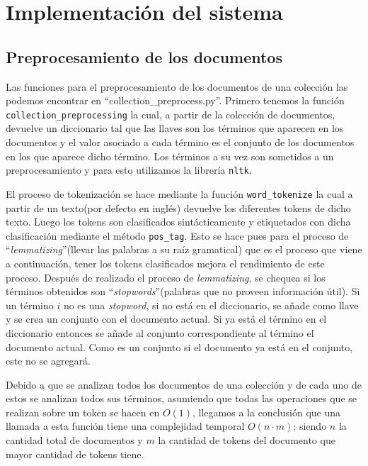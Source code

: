 \documentclass[runningheads]{llncs}
\begin{document}
	\section{Implementaci\'on del sistema}
	
	\subsection{Preprocesamiento de los documentos}
	
	Las funciones para el preprocesamiento de los documentos de una colecci\'on las podemos encontrar en ``collection\_preprocess.py''. Primero tenemos la funci\'on \verb|collection_preprocessing| la cual, a partir de la colecci\'on de documentos, devuelve un diccionario tal que las llaves son los t\'erminos que aparecen en los documentos y el valor asociado a cada t\'ermino es el conjunto de los documentos en los que aparece dicho t\'ermino. Los t\'erminos a su vez son sometidos a un preprocesamiento y para esto utilizamos la librer\'ia \verb|nltk|.
	
	El proceso de tokenizaci\'on se hace mediante la funci\'on \verb|word_tokenize| la cual a partir de un texto(por defecto en ingl\'es) devuelve los diferentes tokens de dicho texto. Luego los tokens son clasificados sint\'acticamente y etiquetados con dicha clasificaci\'on mediante el m\'etodo \verb|pos_tag|. Esto se hace pues para el proceso de ``\textit{lemmatizing}''(llevar las palabras a su ra\'iz gramatical) que es el proceso que viene a continuaci\'on, tener los tokens clasificados mejora el rendimiento de este proceso. Despu\'es de realizado
	el proceso de \textit{lemmatizing}, se chequea si los t\'erminos obtenidos son ``\textit{stopwords}''(palabras que no proveen informaci\'on \'util). Si un t\'ermino $i$ no es una \textit{stopword}, si no est\'a en el diccionario, se a\~{n}ade como llave y se crea un conjunto con el documento actual. Si ya est\'a el t\'ermino en el diccionario entonces se a\~{n}ade al conjunto correspondiente al t\'ermino el documento actual. Como es un conjunto si el documento ya est\'a en el conjunto, este no se agregar\'a.
	
	Debido a que se analizan todos los documentos de una colecci\'on y de cada uno de estos se analizan todos sus t\'erminos, asumiendo que todas las operaciones que se realizan sobre un token se hacen en $O(1)$, llegamos a la conclusi\'on que una llamada a esta funci\'on tiene una complejidad temporal $O(n\cdot m)$; siendo $n$ la cantidad total de documentos y $m$ la cantidad de tokens del documento que mayor cantidad de tokens tiene.
	
\end{document}
